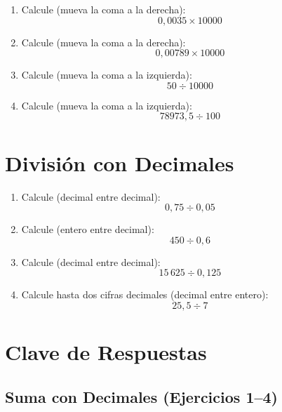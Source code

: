 \documentclass[12pt, letterpaper]{article}
\begin{document}
\begin{enumerate}[leftmargin=*]
  \item Calcule (mueva la coma a la derecha):
        \[
          0{,}0035 \times 10000
        \]

  \item Calcule (mueva la coma a la derecha):
        \[
          0{,}00789 \times 10000
        \]

  \item Calcule (mueva la coma a la izquierda):
        \[
          50 \div 10000
        \]

  \item Calcule (mueva la coma a la izquierda):
        \[
          78973{,}5 \div 100
        \]
\end{enumerate}

\newpage

\section{División con Decimales}

\begin{enumerate}[leftmargin=*]
  \item Calcule (decimal entre decimal):
        \[
          0{,}75 \div 0{,}05
        \]

  \item Calcule (entero entre decimal):
        \[
          450 \div 0{,}6
        \]

  \item Calcule (decimal entre decimal):
        \[
          15\,625 \div 0{,}125
        \]

  \item Calcule hasta dos cifras decimales (decimal entre entero):
        \[
          25{,}5 \div 7
        \]
\end{enumerate}

\newpage

\ifmwclaves
  \section{Clave de Respuestas}

  \subsection*{Suma con Decimales (Ejercicios 1--4)}
\end{document}
